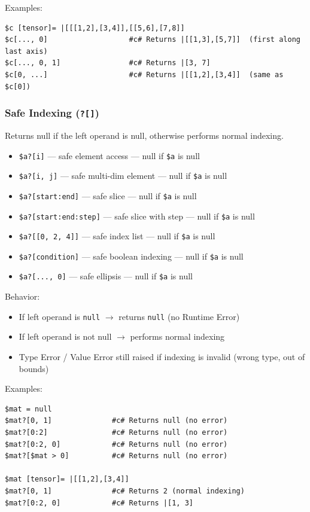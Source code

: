 Examples:
\begin{verbatim}
$c [tensor]= |[[[1,2],[3,4]],[[5,6],[7,8]]
$c[..., 0]                   #c# Returns |[[1,3],[5,7]]  (first along last axis)
$c[..., 0, 1]                #c# Returns |[3, 7]
$c[0, ...]                   #c# Returns |[[1,2],[3,4]]  (same as $c[0])
\end{verbatim}

\subsubsection{Safe Indexing (\texttt{?[]})}
Returns null if the left operand is null, otherwise performs normal indexing.
\begin{itemize}
\item \texttt{\$a?[i]} --- safe element access --- null if \texttt{\$a} is null
\item \texttt{\$a?[i, j]} --- safe multi-dim element --- null if \texttt{\$a} is null
\item \texttt{\$a?[start:end]} --- safe slice --- null if \texttt{\$a} is null
\item \texttt{\$a?[start:end:step]} --- safe slice with step --- null if \texttt{\$a} is null
\item \texttt{\$a?[[0, 2, 4]]} --- safe index list --- null if \texttt{\$a} is null
\item \texttt{\$a?[condition]} --- safe boolean indexing --- null if \texttt{\$a} is null
\item \texttt{\$a?[..., 0]} --- safe ellipsis --- null if \texttt{\$a} is null
\end{itemize}

Behavior:
\begin{itemize}
\item If left operand is \texttt{null} $\rightarrow$ returns \texttt{null} (no Runtime Error)
\item If left operand is not null $\rightarrow$ performs normal indexing
\item Type Error / Value Error still raised if indexing is invalid (wrong type, out of bounds)
\end{itemize}

Examples:
\begin{verbatim}
$mat = null
$mat?[0, 1]              #c# Returns null (no error)
$mat?[0:2]               #c# Returns null (no error)
$mat?[0:2, 0]            #c# Returns null (no error)
$mat?[$mat > 0]          #c# Returns null (no error)

$mat [tensor]= |[[1,2],[3,4]]
$mat?[0, 1]              #c# Returns 2 (normal indexing)
$mat?[0:2, 0]            #c# Returns |[1, 3]
\end{verbatim}

